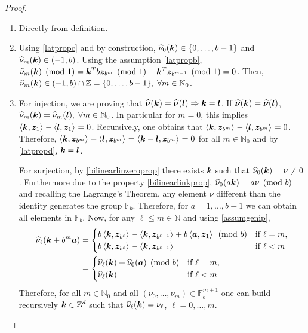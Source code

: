 \documentclass[graybox]{svmult}
\newcommand{\Z}{\mathbb{Z}} %
\newcommand{\N}{\mathbb{N}} %
\newcommand{\F}{\mathbb{F}} %
\newcommand{\bsz}{\boldsymbol{z}}    %
\begin{document}
\begin{proof}
\begin{enumerate}
\item Directly from definition.
\item Using \eqref{latpropc} and by construction, $\widehat{\nu}_0(\boldsymbol{k})\in\{0,\dots,b-1\}$ and $\widehat{\nu}_m(\boldsymbol{k})\in (-1,b)$. Using the assumption \eqref{latpropb}, $\hnu_m(\bsk)\pmod 1=\bsk^Tb\bsz_{b^m}\pmod 1-\bsk^T\bsz_{b^{m-1}}\pmod 1=0$. Then, $\hnu_m(\bsk)\in (-1,b)\cap\Z=\{0,\dots,b-1\},\;\forall m\in\N_0$.

\item For injection, we are proving that $\widehat{\boldsymbol{\nu}}(\boldsymbol{k})=\widehat{\boldsymbol{\nu}}(\boldsymbol{l}) \Rightarrow \boldsymbol{k} = \boldsymbol{l}$. If $\widehat{\boldsymbol{\nu}}(\boldsymbol{k})=\widehat{\boldsymbol{\nu}}(\boldsymbol{l})$, $\hnu_m(\bsk)=\hnu_m(\bsl),\;\forall m\in\N_0$. In particular for $m=0$, this implies $\ip{\bsk}{\bsz_1}-\ip{\bsl}{\bsz_1}=0$. Recursively, one obtains that $\ip{\bsk}{\bsz_{b^m}}-\ip{\bsl}{\bsz_{b^m}}=0$. Therefore, $\ip{\bsk}{\bsz_{b^{m}}}-\ip{\bsl}{\bsz_{b^{m}}}=\ip{\bsk-\bsl}{\bsz_{b^{m}}}=0$ for all $m\in\N_0$ and by \eqref{latpropd}, $\boldsymbol{k}=\boldsymbol{l}$.

For surjection, by \eqref{bilinearlinzeroprop} there exists $\boldsymbol{k}$ such that $\widehat{\nu}_0(\boldsymbol{k})=\nu\neq 0$. Furthermore due to the property \eqref{bilinearlinkprop}, $\widehat{\nu}_0(a\boldsymbol{k})=a\nu \pmod b$ and recalling the Lagrange's Theorem, any element $\nu$ different than the identity generates the group $\F_b$. Therefore, for $a=1,\dots,b-1$ we can obtain all elements in $\F_b$. Now, for any $\ell\leq m\in\N$ and using \eqref{assumgenip},
\begin{align*}
\hnu_\ell(\bsk+b^m\bsa)&=
\begin{cases}
b\ip{\bsk}{\bsz_{b^\ell}}-\ip{\bsk}{\bsz_{b^{\ell-1}}}+b\ip{\bsa}{\bsz_{1}} \pmod b  &\mbox{if } \ell=m, \\
b\ip{\bsk}{\bsz_{b^\ell}}-\ip{\bsk}{\bsz_{b^{\ell-1}}} &\mbox{if } \ell<m   \end{cases}\\
&=
\begin{cases}
\hnu_\ell(\bsk)+\hnu_0(\bsa) \pmod b  &\mbox{if } \ell=m, \\
\hnu_\ell(\bsk) &\mbox{if } \ell<m   \end{cases}\\
\end{align*}%
Therefore, for all $m\in \N_0$ and all $(\nu_0,\dots,\nu_m) \in \F_b^{m+1}$ one can build recursively $\bsk \in \Z^d$ such that  $\widehat{\nu}_\ell(\boldsymbol{k})=\nu_\ell$, $\ell=0,\dots,m$.


\end{enumerate}
\end{proof}
\end{document}
